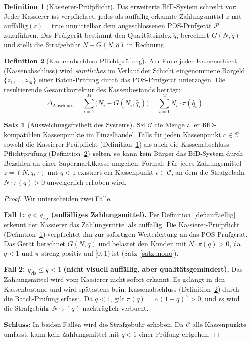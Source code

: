 ﻿\documentclass[a4paper,12pt]{article}
\theoremstyle{definition}
\newtheorem{definition}{Definition}
\newtheorem{satz}{Satz}
\begin{document}
\begin{definition}[Kassierer-Prüfpflicht]
\label{def:prüfpflicht}
Das erweiterte BfD-System schreibt vor: Jeder Kassierer ist verpflichtet,
jedes als auffällig erkannte Zahlungsmittel $z$ mit $\text{auffällig}(z) = \text{true}$
unmittelbar dem angeschlossenen POS-Prüfgerät $\mathcal{P}$ zuzuführen.
Das Prüfgerät bestimmt den Qualitätsindex $\hat{q}$, berechnet $G(N,\hat{q})$
und stellt die Strafgebühr $N - G(N,\hat{q})$ in Rechnung.
\end{definition}

\begin{definition}[Kassenabschluss-Pflichtprüfung]
\label{def:kassenabschluss}
Am Ende jeder Kassenschicht (Kassenabschluss) wird \emph{sämtliches}
im Verlauf der Schicht eingenommene Bargeld $\{z_1,\ldots,z_M\}$ einer
Batch-Prüfung durch das POS-Prüfgerät unterzogen.
Die resultierende Gesamtkorrektur des Kassenbestands beträgt:
\[
\Delta_{\text{Abschluss}} = \sum_{i=1}^{M} \bigl(N_i - G(N_i, \hat{q}_i)\bigr)
= \sum_{i=1}^{M} N_i \cdot \pi(\hat{q}_i).
\]
\end{definition}

\begin{satz}[Ausweichungsfreiheit des Systems]
\label{satz:ausweich}
Sei $\mathcal{C}$ die Menge aller BfD-kompatiblen Kassenpunkte im Einzelhandel.
Falls für jeden Kassenpunkt $c \in \mathcal{C}$ sowohl die Kassierer-Prüfpflicht
(Definition~\ref{def:prüfpflicht}) als auch die Kassenabschluss-Pflichtprüfung
(Definition~\ref{def:kassenabschluss}) gelten, so kann kein Bürger das BfD-System
durch Bezahlen an einer Supermarktkasse umgehen.  Formal:
Für jedes Zahlungsmittel $z = (N, q, \tau)$ mit $q < 1$ existiert ein
Kassenpunkt $c \in \mathcal{C}$, an dem die Strafgebühr $N \cdot \pi(q) > 0$
unweigerlich erhoben wird.
\end{satz}

\begin{proof}
Wir unterscheiden zwei Fälle.

\textbf{Fall 1: $q < q_{\text{vis}}$ (auffälliges Zahlungsmittel).}
Per Definition~\ref{def:auffaellig} erkennt der Kassierer das Zahlungsmittel
als auffällig.  Die Kassierer-Prüfpflicht (Definition~\ref{def:prüfpflicht})
verpflichtet ihn zur sofortigen Weiterleitung an das POS-Prüfgerät.
Das Gerät berechnet $G(N, q)$ und belastet den Kunden mit $N \cdot \pi(q) > 0$,
da $q < 1$ und $\pi$ streng positiv auf $[0,1)$ ist (Satz~\ref{satz:mono}).

\textbf{Fall 2: $q_{\text{vis}} \leq q < 1$ (nicht visuell auffällig,
aber qualitätsgemindert).}
Das Zahlungsmittel wird vom Kassierer nicht sofort erkannt.
Es gelangt in den Kassenbestand und wird spätestens beim Kassenabschluss
(Definition~\ref{def:kassenabschluss}) durch die Batch-Prüfung erfasst.
Da $q < 1$, gilt $\pi(q) = \alpha(1-q)^{\beta} > 0$, und es wird die
Strafgebühr $N \cdot \pi(q)$ nachträglich verbucht.

\textbf{Schluss:} In beiden Fällen wird die Strafgebühr erhoben.
Da $\mathcal{C}$ alle Kassenpunkte umfasst, kann kein Zahlungsmittel
mit $q < 1$ einer Prüfung entgehen.
\end{proof}
\end{document}
